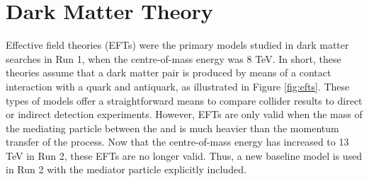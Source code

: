 \label{chapter:theory}

\section{Dark Matter Theory}

Effective field theories (EFTs) \cite{Boveia:2016mrp} \cite{Carpenter:2012rg} were the primary models studied in \etmissX dark matter searches in Run 1, when the centre-of-mass energy was 8 TeV. In short, these theories assume that a dark matter pair is produced by means of a contact interaction with a quark and antiquark, as illustrated in Figure \ref{fig:efts}. These types of models offer a straightforward means to compare collider results to direct or indirect detection experiments. However, EFTs are only valid when the mass of the mediating particle between the \chichi and \qq is much heavier than the momentum transfer of the process. Now that the centre-of-mass energy has increased to 13 TeV in Run 2, these EFTs are no longer valid. Thus, a new baseline model is used in Run 2 with the mediator particle explicitly included.

